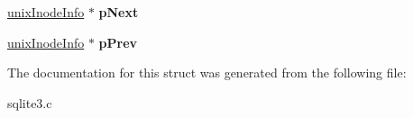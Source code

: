 \begin{DoxyCompactItemize}
\item 
\hyperlink{structunixInodeInfo}{unix\+Inode\+Info} $\ast$ {\bfseries p\+Next}\hypertarget{structunixInodeInfo_a80181ba4ef71dd0d8e55e97baedc761e}{}\label{structunixInodeInfo_a80181ba4ef71dd0d8e55e97baedc761e}

\item 
\hyperlink{structunixInodeInfo}{unix\+Inode\+Info} $\ast$ {\bfseries p\+Prev}\hypertarget{structunixInodeInfo_a6575edce9898b48870c6f48047c01d01}{}\label{structunixInodeInfo_a6575edce9898b48870c6f48047c01d01}

\end{DoxyCompactItemize}


The documentation for this struct was generated from the following file\+:\begin{DoxyCompactItemize}
\item 
sqlite3.\+c\end{DoxyCompactItemize}
